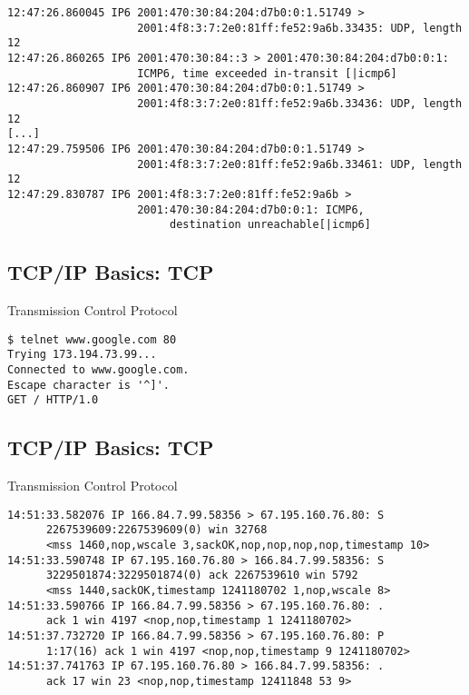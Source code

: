 \documentclass[xga]{xdvislides}
\begin{document}
\begin{verbatim}
12:47:26.860045 IP6 2001:470:30:84:204:d7b0:0:1.51749 >
                    2001:4f8:3:7:2e0:81ff:fe52:9a6b.33435: UDP, length 12
12:47:26.860265 IP6 2001:470:30:84::3 > 2001:470:30:84:204:d7b0:0:1:
                    ICMP6, time exceeded in-transit [|icmp6]
12:47:26.860907 IP6 2001:470:30:84:204:d7b0:0:1.51749 >
                    2001:4f8:3:7:2e0:81ff:fe52:9a6b.33436: UDP, length 12
[...]
12:47:29.759506 IP6 2001:470:30:84:204:d7b0:0:1.51749 >
                    2001:4f8:3:7:2e0:81ff:fe52:9a6b.33461: UDP, length 12
12:47:29.830787 IP6 2001:4f8:3:7:2e0:81ff:fe52:9a6b >
                    2001:470:30:84:204:d7b0:0:1: ICMP6,
                         destination unreachable[|icmp6]
\end{verbatim}

\subsection{TCP/IP Basics: TCP}
\begin{center}
Transmission Control Protocol
\end{center}
\vspace{.2in}
\begin{verbatim}
$ telnet www.google.com 80
Trying 173.194.73.99...
Connected to www.google.com.
Escape character is '^]'.
GET / HTTP/1.0

\end{verbatim}

\subsection{TCP/IP Basics: TCP}
\begin{center}
Transmission Control Protocol
\end{center}
\vspace{.2in}
\begin{verbatim}
14:51:33.582076 IP 166.84.7.99.58356 > 67.195.160.76.80: S
      2267539609:2267539609(0) win 32768
      <mss 1460,nop,wscale 3,sackOK,nop,nop,nop,nop,timestamp 10>
14:51:33.590748 IP 67.195.160.76.80 > 166.84.7.99.58356: S
      3229501874:3229501874(0) ack 2267539610 win 5792
      <mss 1440,sackOK,timestamp 1241180702 1,nop,wscale 8>
14:51:33.590766 IP 166.84.7.99.58356 > 67.195.160.76.80: .
      ack 1 win 4197 <nop,nop,timestamp 1 1241180702>
14:51:37.732720 IP 166.84.7.99.58356 > 67.195.160.76.80: P
      1:17(16) ack 1 win 4197 <nop,nop,timestamp 9 1241180702>
14:51:37.741763 IP 67.195.160.76.80 > 166.84.7.99.58356: .
      ack 17 win 23 <nop,nop,timestamp 12411848 53 9>
\end{verbatim}
\end{document}
